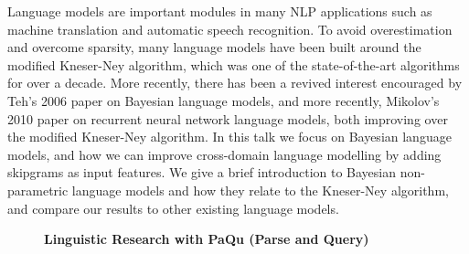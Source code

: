 \documentclass[10pt, a4paper, twopage, headinclude, footinclude, BCOR5mm]{scrartcl}
\begin{document}
        \begin{table}[t!]
    \end{table}

\noindent
Language models are important modules in many NLP applications such as machine translation and automatic speech recognition. To avoid overestimation and overcome sparsity, many language models have been built around the modified Kneser-Ney algorithm, which was one of the state-of-the-art algorithms for over a decade. More recently, there has been a revived interest encouraged by Teh's 2006 paper on Bayesian language models, and more recently, Mikolov's 2010 paper on recurrent neural network language models, both improving over the modified Kneser-Ney algorithm. In this talk we focus on Bayesian language models, and how we can improve cross-domain language modelling by adding skipgrams as input features. We give a brief introduction to Bayesian non-parametric language models and how they relate to the Kneser-Ney algorithm, and compare our results to other existing language models.


\newpage

\begin{figure}[t!]
\centering
\large\textbf{Linguistic Research with PaQu (Parse and Query) }
\vspace*{0.5cm}
\end{figure}


        \begin{table}[t!]
    \end{table}
\end{document}
